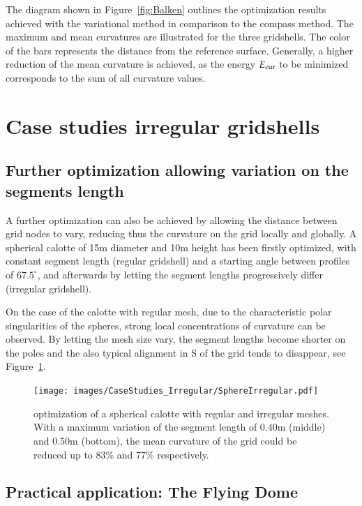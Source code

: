 \documentclass[Thesis.tex]{subfiles}
\begin{document}
The diagram shown in Figure~\ref{fig:Balken} outlines the optimization results achieved with the variational method in comparison to the compass method. The maximum and mean curvatures are illustrated for the three gridshells. The color of the bars represents the distance from the reference surface. Generally, a higher reduction of the mean curvature is achieved, as the energy $E_{\textrm{\scriptsize{cur}}}$ to be minimized corresponds to the sum of all curvature values.

\section{Case studies irregular gridshells}

\subsection{Further optimization allowing variation on the segments length}

A further optimization can also be achieved by allowing the distance between grid nodes to vary, reducing thus the curvature on the grid locally and globally. A spherical calotte of 15m diameter and 10m height has been firstly optimized, with constant segment length (regular gridshell) and a starting angle between profiles of $67.5^\circ$, and afterwards  by letting the segment lengths progressively differ (irregular gridshell). 

On the case of the calotte with regular mesh, due to the characteristic polar singularities of the spheres, strong local concentrations of curvature can be observed. By letting the mesh size vary, the segment lengths become shorter on the poles and the also typical alignment in S of the grid tends to disappear, see Figure~\ref{fig:SphereIrregular}.

\begin{figure}
\centering
\texttt{[image: images/CaseStudies\_Irregular/SphereIrregular.pdf]}
\caption{optimization of a spherical calotte with regular and irregular meshes. With a maximum variation of the segment length of 0.40m (middle) and 0.50m (bottom), the mean curvature of the grid could be reduced up to 83\% and 77\% respectively.}
\label{fig:SphereIrregular}
\end{figure}

\subsection{Practical application: The Flying Dome}
\end{document}

